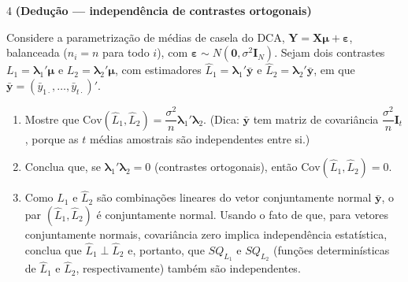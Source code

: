 \documentclass[11pt]{article}
\begin{document}
\begin{questao}{4} \textbf{(Dedução --- independência de contrastes ortogonais)}

Considere a parametrização de médias de casela do DCA, $\mathbf Y = \mathbf X\boldsymbol\mu +
\boldsymbol\varepsilon$, balanceada ($n_i = n$ para todo $i$), com
$\boldsymbol\varepsilon \sim N(\mathbf 0, \sigma^2\mathbf I_N)$. Sejam dois contrastes
$L_1 = \boldsymbol\lambda_1'\boldsymbol\mu$ e $L_2 = \boldsymbol\lambda_2'\boldsymbol\mu$, com
estimadores $\hat L_1 = \boldsymbol\lambda_1'\bar{\mathbf y}$ e
$\hat L_2 = \boldsymbol\lambda_2'\bar{\mathbf y}$, em que $\bar{\mathbf y} = (\bar y_{1\cdot},
\ldots, \bar y_{t\cdot})'$.

\begin{enumerate}[label=(\alph*)]
  \item Mostre que $\mathrm{Cov}(\hat L_1, \hat L_2) = \dfrac{\sigma^2}{n}\boldsymbol\lambda_1'
    \boldsymbol\lambda_2$. (Dica: $\bar{\mathbf y}$ tem matriz de covariância
    $\dfrac{\sigma^2}{n}\mathbf I_t$, porque as $t$ médias amostrais são independentes entre si.)
  \item Conclua que, se $\boldsymbol\lambda_1'\boldsymbol\lambda_2 = 0$ (contrastes ortogonais),
    então $\mathrm{Cov}(\hat L_1, \hat L_2) = 0$.
  \item Como $\hat L_1$ e $\hat L_2$ são combinações lineares do vetor conjuntamente normal
    $\bar{\mathbf y}$, o par $(\hat L_1, \hat L_2)$ é conjuntamente normal. Usando o fato de que,
    para vetores conjuntamente normais, covariância zero implica independência estatística,
    conclua que $\hat L_1 \perp \hat L_2$ e, portanto, que $SQ_{L_1}$ e $SQ_{L_2}$ (funções
    determinísticas de $\hat L_1$ e $\hat L_2$, respectivamente) também são independentes.
\end{enumerate}
\end{questao}
\end{document}
